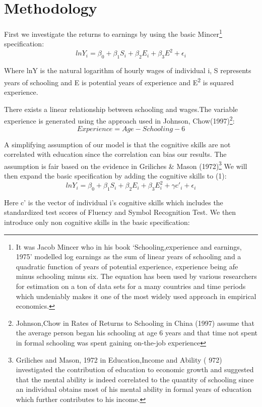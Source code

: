 \documentclass[11pt, a4paper, leqno]{article}
\begin{document}
\section*{Methodology}

First we investigate the returns to earnings by  using the basic Mincer\footnote{It was Jacob Mincer who in his book ‘Schooling,experience and earnings, 1975’ modelled log earnings as  the sum of linear years of schooling and a quadratic function of years of potential experience, experience being afe minus schooling minus six. The equation has been used by various researchers for estimation on a ton of data sets for a many countries and time periods which undeniably makes it one of the most widely used approach in empirical economics.} specification:
   \[lnY_{i} = \beta_{0} + \beta_{1}S_{i} + \beta_{2}E_{i} + \beta_{3}E^{2}+\epsilon_{i} \label{eq:basic} \tag{1} \]                        

Where lnY is the natural logarithm of hourly wages of individual i, S represents years of schooling and E is potential years of experience and E\textsuperscript{2} is squared experience.\par
There exists a linear relationship between schooling and wages.The variable experience is generated using the approach used in Johnson, Chow(1997)\footnote{Johnson,Chow in Rates of Returns to Schooling in China (1997) assume that the average person began his schooling at age  6  years  and  that  time  not  spent  in  formal  schooling  was  spent  gaining  on-the-job experience
}:
                     \[ Experience = Age- Schooling -6\]
                     
 A simplifying assumption of our model is that the cognitive skills are not correlated with education since the correlation can bias our results. The assumption is fair based on the evidence in Griliches \& Mason (1972)\footnote{Griliches and Mason, 1972 in Education,Income and Ability ( 972) investigated the contribution of education to economic growth and suggested that the mental ability is indeed correlated to the quantity of schooling since an individual obtains most of his mental ability in formal years of education which further contributes to his income.}
 We will then expand the basic specification by adding the cognitive skills to (1):
 \[lnY_{i} = \beta_{0} + \beta_{1}S_{i} + \beta_{2}E_{i} + \beta_{3}E_{i}^{2} + \gamma c'_{i} +\epsilon_{i} \label{eq:cog} \tag{2} \]  
 
 Here c' is the vector of individual i’s cognitive skills which includes the standardized test scores of Fluency and Symbol Recognition Test.
 We then introduce only non cognitive skills in the basic specification:
 
\end{document}
